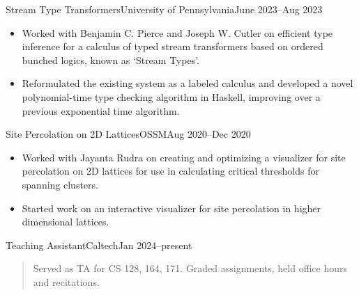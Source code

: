 \documentclass[a4paper,10pt]{article}
\begin{document}
    \begin{activity*}{Stream Type Transformers}{University of Pennsylvania}{June 2023--Aug 2023}
      \begin{itemize}[topsep=5pt, partopsep=0pt, itemsep=-1pt]
        \item Worked with Benjamin C. Pierce and Joseph W. Cutler on efficient type inference for a calculus of typed stream transformers based on ordered bunched logics, known as `Stream Types'.
        \item Reformulated the existing system as a labeled calculus and developed a novel polynomial-time type checking algorithm in Haskell, improving over a previous exponential time algorithm.
      \end{itemize}
    \end{activity*}

    \begin{activity*}{Site Percolation on 2D Lattices}{OSSM}{Aug 2020--Dec 2020}
      \begin{itemize}[topsep=5pt, partopsep=0pt, itemsep=-1pt]
        \item Worked with Jayanta Rudra on creating and optimizing a visualizer for site percolation on 2D lattices for use in calculating critical thresholds for spanning clusters.
        \item Started work on an interactive visualizer for site percolation in higher dimensional lattices.
      \end{itemize}
    \end{activity*}


    \begin{activity*}{Teaching Assistant}{Caltech}{Jan 2024--present}
    \begin{quote}
      \vspace{-\baselineskip}
      \vspace{\parskip}

      Served as TA for CS 128, 164, 171. Graded assignments, held office hours and recitations.

      \vspace{-\baselineskip}
      \vspace{\parskip}
    \end{quote}
    \end{activity*}
\end{document}
